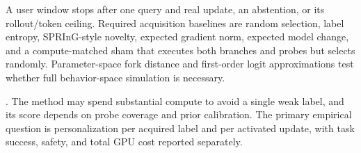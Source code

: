A user window stops after one query and real update, an abstention, or its
rollout/token ceiling.  Required acquisition baselines are random selection,
label entropy, SPRInG-style novelty, expected gradient norm, expected model
change, and a compute-matched sham that executes both branches and probes but
selects randomly.  Parameter-space fork distance and first-order logit
approximations test whether full behavior-space simulation is necessary.

\Evidence.  The method may spend substantial compute to avoid a single weak
label, and its score depends on probe coverage and prior calibration.  The
primary empirical question is personalization per acquired label and per
activated update, with task success, safety, and total GPU cost reported
separately.
